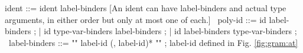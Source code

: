 \begin{syntax}
  ident ::= ident label-binders [An ident can have label-binders and actual type arguments, in either order but only at most one of each.]
  \
  poly-id ::= id label-binders ;
  | id type-var-binders label-binders ;
  | id label-binders type-var-binders ;
  \
  label-binders ::= "{" label-id (, label-id)* "}" ; label-id defined in Fig. \ref{fig:gram:at}
\end{syntax}

